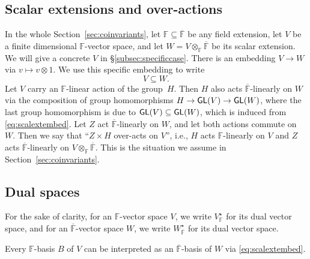 \documentclass[a4paper]{extarticle}
\newcommand{\IF}{\mathbb{F}}
\newcommand{\oIF}{{\overline{\mathbb{F}}}}
\newcommand{\GL}{\textsf{\textup{GL}}}
\numberwithin{theorem}{section}
\theoremstyle{definition}
\begin{document}
\subsection{Scalar extensions and over-actions}\label{subsec:overact}
In the whole Section~\ref{sec:coinvariants}, let $\IF\subseteq\oIF$ be any field extension, let $V$ be a finite dimensional $\IF$-vector space, and let $W=V\otimes_\IF\oIF$ be its scalar extension.
We will give a concrete $V$ in \S\ref{subsec:specificcase}.
There is an embedding $V\to W$ via $v\mapsto v\otimes 1$. We use this specific embedding to write
\begin{equation}\label{eq:scalextembed}
V\subseteq W.
\end{equation}
Let $V$ carry an $\IF$-linear action of the group~$H$.
Then $H$ also acts $\oIF$-linearly on $W$ via the composition of group homomorphisms
$H \to \GL(V) \to \GL(W)$,
where the last group homomorphism is due to $\GL(V)\subseteq\GL(W)$, which is induced from \eqref{eq:scalextembed}.
Let $Z$ act $\oIF$-linearly on $W$, and let both actions commute on~$W$.
Then we say that ``$Z\times H$ over-acts on $V$'', i.e., $H$ acts $\IF$-linearly on $V$ and $Z$ acts $\oIF$-linearly on $V\otimes_\IF\oIF$.
This is the situation we assume in Section~\ref{sec:coinvariants}.


\subsection{Dual spaces}
For the sake of clarity, for an $\IF$-vector space $V$, we write $V^\star_\IF$ for its dual vector space,
and for an $\oIF$-vector space $W$, we write $W^\star_\oIF$ for its dual vector space.
 
Every $\IF$-basis $B$ of $V$ can be interpreted as an $\oIF$-basis of $W$ via \eqref{eq:scalextembed}.
\end{document}
